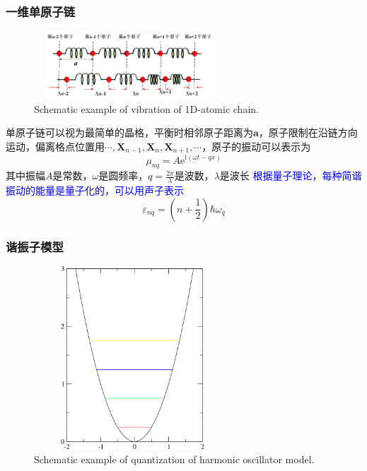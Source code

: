 \frame
{
	\frametitle{一维单原子链}
\begin{figure}[h!]
\centering
\vspace*{-0.25in}
\includegraphics[height=1.0in,width=2.8in,viewport=0 0 1400 500,clip]{Figures/virbration.png}
\caption{\tiny \textrm{Schematic example of vibration of 1D-atomic chain.}}%
\label{virbration}
\end{figure} 
单原子链可以视为最简单的晶格，平衡时相邻原子距离为$\mathbf{a}$，原子限制在沿链方向运动，偏离格点位置用$\cdots,\mathbf{X}_{n-1},\mathbf{X}_{n},\mathbf{X}_{n+1},\cdots$，原子的振动可以表示为
\begin{displaymath}
	\mu_{nq}=A\mathrm{e}^{\mathrm{i}(\omega t-qx)}
\end{displaymath}
其中振幅$A$是常数，$\omega$是圆频率，$q=\tfrac{2\pi}{\lambda}$是波数，$\lambda$是波长
\vskip 5pt
\textcolor{blue}{根据量子理论，每种简谐振动的能量是量子化的，可以用声子表示}
\begin{displaymath}
	\varepsilon_{nq}=\left( n+\frac12 \right)\hbar\omega_q
\end{displaymath}
}

\frame
{
	\frametitle{谐振子模型}
\begin{figure}[h!]
\centering
\vspace*{-0.15in}
\includegraphics[height=2.7in,width=2.9in,viewport=0 0 650 800,clip]{Figures/Quantum-viberation.png}
\caption{\tiny \textrm{Schematic example of quantization of  harmonic oscillator model.}}%
\label{Harmonic-oscillator-model}
\end{figure} 
}


